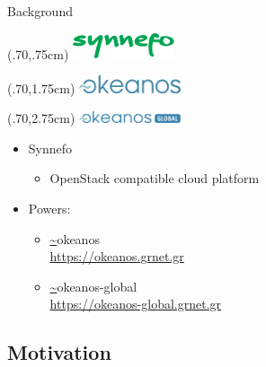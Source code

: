 \documentclass[utf8]{beamer}
\newcommand{\okeanos}{\url{~}okeanos}
\begin{document}
\begin{frame}{Background}

  \begin{textblock*}{3cm}(.70\textwidth,.75cm)
    \includegraphics[width=3cm]{figures/synnefo-logo.pdf}
  \end{textblock*}

  \begin{textblock*}{3cm}(.70\textwidth,1.75cm)
    \includegraphics[width=3cm]{figures/okeanos-logo.pdf}
  \end{textblock*}

  \begin{textblock*}{3cm}(.70\textwidth,2.75cm)
    \includegraphics[width=3cm]{figures/okeanos-global.png}
  \end{textblock*}

  \begin{itemize}
  \item Synnefo
    \begin{itemize}
      \item OpenStack compatible cloud platform
    \end{itemize}
  \item Powers:
    \begin{itemize}
    \item \okeanos\\
      \url{https://okeanos.grnet.gr}
    \item \okeanos-global\\
      \url{https://okeanos-global.grnet.gr}
    \end{itemize}
  \end{itemize}

\end{frame}

\subsection{Motivation}
\end{document}
